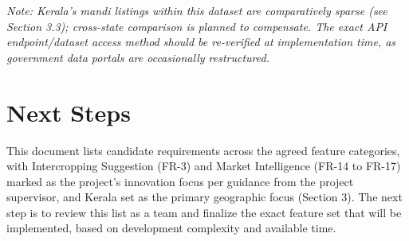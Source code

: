 \documentclass[12pt,a4paper]{article}
\begin{document}
\textit{Note: Kerala's mandi listings within this dataset are comparatively sparse (see Section 3.3); cross-state comparison is planned to compensate. The exact API endpoint/dataset access method should be re-verified at implementation time, as government data portals are occasionally restructured.}

\section{Next Steps}
This document lists candidate requirements across the agreed feature categories, with Intercropping Suggestion (FR-3) and Market Intelligence (FR-14 to FR-17) marked as the project's innovation focus per guidance from the project supervisor, and Kerala set as the primary geographic focus (Section 3). The next step is to review this list as a team and finalize the exact feature set that will be implemented, based on development complexity and available time.
\end{document}
